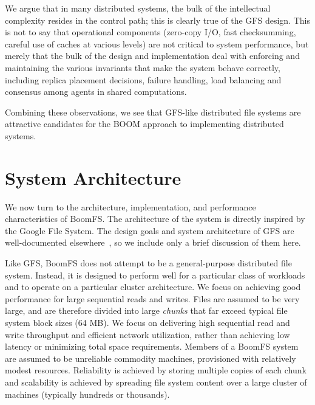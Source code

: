 \documentclass[twocolumn]{article}
\begin{document}
We argue that in many distributed systems, the bulk of the
intellectual complexity resides in the control path; this is clearly
true of the GFS design. This is not to say that operational components
(zero-copy I/O, fast checksumming, careful use of caches at various
levels) are not critical to system performance, but merely that the
bulk of the design and implementation deal with enforcing and
maintaining the various invariants that make the system behave
correctly, including replica placement decisions, failure handling,
load balancing and consensus among agents in shared computations.

Combining these observations, we see that GFS-like distributed file
systems are attractive candidates for the BOOM approach to
implementing distributed systems.

\section{System Architecture}
\label{system-arch}
We now turn to the architecture, implementation, and performance
characteristics of BoomFS. The architecture of the system is directly
inspired by the Google File System. The design goals and system
architecture of GFS are well-documented elsewhere~\cite{gfs,
  hdfs-arch}, so we include only a brief discussion of them here.

Like GFS, BoomFS does not attempt to be a general-purpose distributed
file system. Instead, it is designed to perform well for a particular
class of workloads and to operate on a particular cluster
architecture. We focus on achieving good performance for large
sequential reads and writes. Files are assumed to be very large, and
are therefore divided into large \emph{chunks} that far exceed typical
file system block sizes (64 MB). We focus on delivering high
sequential read and write throughput and efficient network
utilization, rather than achieving low latency or minimizing total
space requirements.  Members of a BoomFS system are assumed to be
unreliable commodity machines, provisioned with relatively modest
resources.  Reliability is achieved by storing multiple copies of each
chunk and scalability is achieved by spreading file system content
over a large cluster of machines (typically hundreds or thousands).
\end{document}
